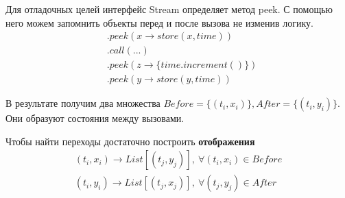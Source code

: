 \begin{frame}
\frametitle{\insertsection} 
\framesubtitle{\insertsubsection}
Для отладочных целей интерфейс Stream определяет метод peek.
С помощью него можем запомнить объекты перед и после вызова не изменив логику.
\begin{align*}
	&.peek(x \rightarrow store(x, time)) \\
	&.call(...)\\
	&.peek(z \rightarrow \{time.increment()\})\\
	&.peek(y \rightarrow store(y, time))
\end{align*}

В результате получим два множества $Before = \{(t_i, x_i)\}, After = \{(t_i, y_i)\}$. Они образуют состояния между вызовами.

Чтобы найти переходы достаточно построить \textbf{отображения}
\begin{align*}
	(t_i, x_i) \rightarrow List[(t_j, y_j)], \ \forall (t_i, x_i) \in Before \\
	(t_i, y_i) \rightarrow List[(t_j, x_j)], \ \forall (t_j, y_j) \in After
\end{align*}

\end{frame}
